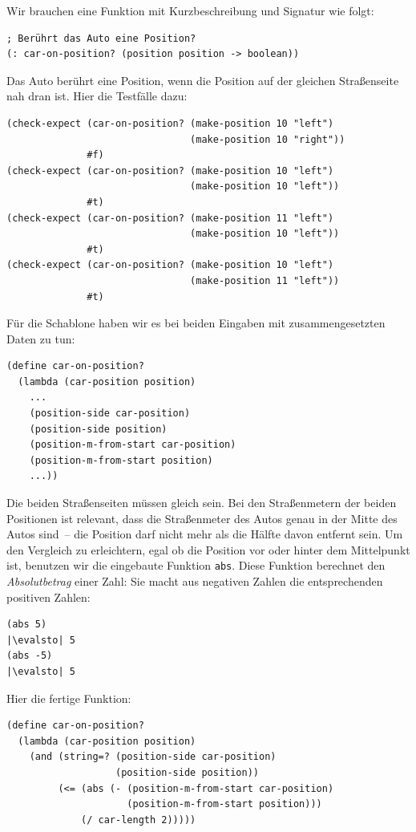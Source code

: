 Wir brauchen eine Funktion mit Kurzbeschreibung und Signatur wie
folgt:
%
\begin{lstlisting}
; Berührt das Auto eine Position?
(: car-on-position? (position position -> boolean))
\end{lstlisting}
%
Das Auto berührt eine Position, wenn die Position auf der gleichen
Straßenseite nah dran ist.  Hier die Testfälle dazu:
%
\begin{lstlisting}
(check-expect (car-on-position? (make-position 10 "left")
                                (make-position 10 "right"))
              #f)
(check-expect (car-on-position? (make-position 10 "left")
                                (make-position 10 "left"))
              #t)
(check-expect (car-on-position? (make-position 11 "left")
                                (make-position 10 "left"))
              #t)
(check-expect (car-on-position? (make-position 10 "left")
                                (make-position 11 "left"))
              #t)
\end{lstlisting}
%
Für die Schablone haben wir es bei beiden Eingaben mit
zusammengesetzten Daten zu tun:
%
\begin{lstlisting}
(define car-on-position?
  (lambda (car-position position)
    ...
    (position-side car-position) 
    (position-side position)
    (position-m-from-start car-position)
    (position-m-from-start position)
    ...))
\end{lstlisting}
%
Die beiden Straßenseiten müssen gleich sein.  Bei den Straßenmetern
der beiden Positionen ist relevant, dass die Straßenmeter des Autos
genau in der Mitte des Autos sind~-- die Position darf nicht mehr als
die Hälfte davon entfernt sein.  Um den Vergleich zu erleichtern, egal
ob die Position vor oder hinter dem Mittelpunkt ist, benutzen wir die
eingebaute Funktion \lstinline{abs}.\label{func:abs}  Diese
Funktion berechnet den \textit{Absolutbetrag}
einer Zahl: Sie macht aus negativen Zahlen die entsprechenden
positiven Zahlen:
%
\begin{lstlisting}
(abs 5)
|\evalsto| 5
(abs -5)
|\evalsto| 5
\end{lstlisting}
%
Hier die fertige Funktion:
%
\begin{lstlisting}
(define car-on-position?
  (lambda (car-position position)
    (and (string=? (position-side car-position) 
                   (position-side position))
         (<= (abs (- (position-m-from-start car-position)
                     (position-m-from-start position)))
             (/ car-length 2)))))
\end{lstlisting}

